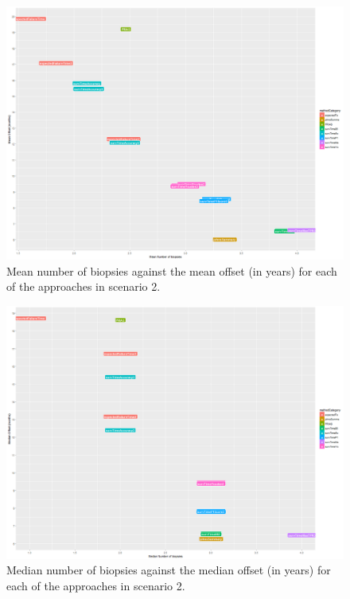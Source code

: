 \begin{figure}[H]
\centering
\captionsetup{justification=centering}
\includegraphics[width=\textwidth]{sim_study_res_sc_6_sh_1pt5/mean_offsetvsnb.png}
\caption{\label{fig : sc_6_sh_1pt5_mean_offsetvsnb} Mean number of biopsies against the mean offset (in years) for each of the approaches in scenario 2.}
\end{figure}

\begin{figure}[H]
\centering
\captionsetup{justification=centering}
\includegraphics[width=\textwidth]{sim_study_res_sc_6_sh_1pt5/median_offsetvsnb.png}
\caption{\label{fig : sc_6_sh_1pt5_median_offsetvsnb}Median number of biopsies against the median offset (in years) for each of the approaches in scenario 2.}
\end{figure}

